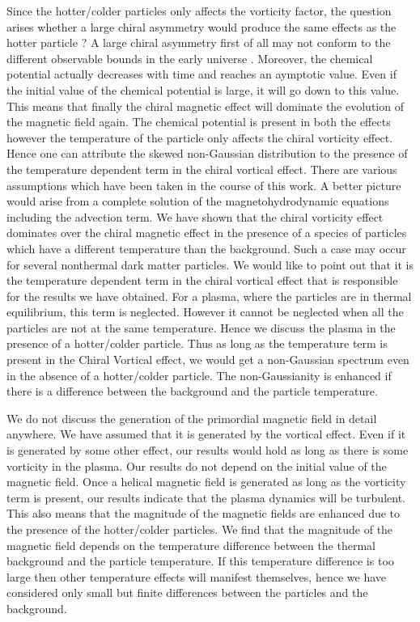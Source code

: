 \documentclass{ws-mpla}
\begin{document}
Since the hotter/colder particles only affects the vorticity factor, the question arises whether a large 
chiral asymmetry would produce the same effects as the hotter particle ? A large chiral asymmetry first of all may not conform to the different observable 
bounds in the early universe \cite{mangano}. Moreover, the chemical potential actually decreases with time and reaches an aymptotic value. Even if the initial value of the 
chemical potential is large, it will go down to this value. This means that finally the chiral magnetic effect will dominate the evolution of the magnetic field 
again. The chemical potential is present in both the effects however the temperature of the particle only affects the chiral vorticity effect. Hence one can attribute 
the skewed non-Gaussian distribution to the presence of the temperature dependent term in the chiral vortical effect. 
There are various assumptions which have been taken in the course of this work. A better picture would arise from a complete solution of the magnetohydrodynamic 
equations including the advection term. We have shown that the chiral vorticity effect dominates over the chiral magnetic effect in the presence of a species of particles
which have a different temperature than the background. Such a case may occur for several nonthermal dark matter particles. We would like to point out that it is the temperature 
dependent term in the chiral vortical effect that is responsible for the results we have obtained. For a plasma, where the particles are in thermal equilibrium, this term is 
neglected. However it cannot be neglected when all the particles are not at the same temperature. Hence we discuss the plasma in the presence of a hotter/colder particle. 
Thus as long as the temperature term is present in the Chiral Vortical effect, we would get a non-Gaussian spectrum even in the absence of a hotter/colder particle. The 
non-Gaussianity is enhanced if there is a difference between the background and the particle temperature.  


We do not discuss the generation of the primordial magnetic field in detail anywhere. We have assumed that it is generated by the vortical effect.
Even if it is generated by some other effect, our results would hold as long as there is some vorticity in the plasma.  
Our results do not depend on the initial value of the magnetic field. Once a helical magnetic field is generated as long as the vorticity term is 
present, our results indicate that the plasma dynamics will be turbulent. This also means that the magnitude of the magnetic fields are enhanced due 
to the presence of the hotter/colder particles. We find that the magnitude of the magnetic field depends on the temperature difference between the thermal background and the 
particle temperature. If this temperature 
difference is too large then other temperature effects will manifest themselves, hence we have considered only small but finite differences between the particles and the 
background. 
\end{document}
